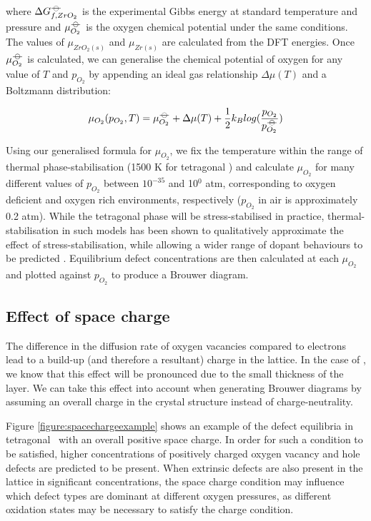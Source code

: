 where $\Delta{G^{{\ensuremath{-\kern-4pt{\ominus}\kern-4pt-}}}_{f, ZrO_2}}$ is the experimental Gibbs energy at standard temperature and pressure and $\mu^{{-\kern-4pt{\ominus}\kern-4pt-}}_{O_2}$ is the oxygen chemical potential under the same conditions. The values of $\mu_{ZrO_2(s)}$ and $\mu_{Zr(s)}$ are calculated from the DFT energies. Once $\mu^{{-\kern-4pt{\ominus}\kern-4pt-}}_{O_2}$ is calculated, we can generalise the chemical potential of oxygen for any value of $T$ and $p_{O_2}$ by appending an ideal gas relationship $\Delta{\mu(T)}$ and a Boltzmann distribution:

\begin{equation}
\mu_{O_2}(p_{O_2},T) = \mu^{{-\kern-4pt{\ominus}\kern-4pt-}}_{O_2} + \Delta{\mu(T)} + \frac{1}{2}{k_B}log(\frac{p_{O_2}}{p^{{-\kern-4pt{\ominus}\kern-4pt-}}_{O_2}})
\end{equation}

Using our generalised formula for $\mu_{O_2}$, we fix the temperature within the range of thermal phase-stabilisation (1500 K for tetragonal \zirconia) and calculate $\mu_{O_2}$ for many different values of $p_{O_2}$ between $10^{-35}$ and 10$^{0}$ atm, corresponding to oxygen deficient and oxygen rich environments, respectively ($p_{O_2}$ in air is approximately 0.2 atm). While the tetragonal phase will be stress-stabilised in practice, thermal-stabilisation in such models has been shown to qualitatively approximate the effect of stress-stabilisation, while allowing a wider range of dopant behaviours to be predicted \cite{Bell2016}. Equilibrium defect concentrations are then calculated at each $\mu_{O_2}$ and plotted against $p_{O_2}$ to produce a Brouwer diagram. 

\subsection{Effect of space charge}

The difference in the diffusion rate of oxygen vacancies compared to electrons lead to a build-up (and therefore a resultant) charge in the lattice. In the case of \zirconia , we know that this effect will be pronounced due to the small thickness of the layer. We can take this effect into account when generating Brouwer diagrams by assuming an overall charge in the crystal structure instead of charge-neutrality. 

Figure \ref{figure:spacechargeexample} shows an example of the defect equilibria in tetragonal \zirconia\ with an overall positive space charge. In order for such a condition to be satisfied, higher concentrations of positively charged oxygen vacancy and hole defects are predicted to be present. When extrinsic defects are also present in the lattice in significant concentrations, the space charge condition may influence which defect types are dominant at different oxygen pressures, as different oxidation states may be necessary to satisfy the charge condition.


